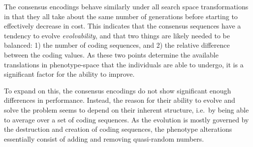 \documentclass[a4paper,12pt]{article}
\theoremstyle{plain}
\theoremstyle{definition}
\begin{document}

      The consensus encodings behave similarly under all search space
      transformations in that they all take about the same number of generations before starting to
      effectively decrease in cost. This indicates that the consensus sequences have a 
      tendency to evolve \textit{evolvability}, and that two things are
      likely needed to be balanced: 1) the number of coding sequences, and 2) the
      relative difference between the coding values. As these two points determine the
      available translations in phenotype-space that the individuals are able to
      undergo, it is a significant factor for the ability to improve. 

      To expand on this, the consensus encodings do not show significant enough differences
      in performance. Instead, the reason for their ability to evolve and solve the
      problem seems to depend on their inherent structure, i.e.\ by being able
      to average over a set of coding sequences. As the evolution is mostly
      governed by the destruction and creation of coding sequences, the
      phenotype alterations essentially consist of adding and removing
      quasi-random numbers. 
\end{document}
